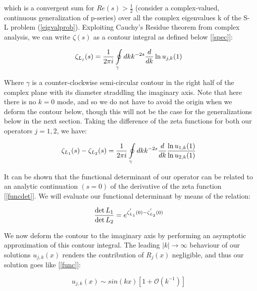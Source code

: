 \documentclass[12]{article}
\begin{document}
which is a convergent sum for \(Re(s) > \frac{1}{2}\) (consider a complex-valued, continuous generalization of p-series) over all the complex eigenvalues k of the S-L problem (\ref{eigvalprob}). Exploiting Cauchy's Residue theorem from complex analysis, we can write \(\zeta(s)\) as a contour integral as defined below [\ref{spec}]:

\begin{equation} \label{zeta}
    \zeta_{L_j}(s) = \frac{1}{2\pi i} \oint\limits_{\gamma}dk k^{-2s} \frac{d}{dk} \ln{u_{j,k}(1)} \\
\end{equation} 

Where \(\gamma\) is a counter-clockwise semi-circular contour in the right half of the complex plane with its diameter straddling the imaginary axis. Note that here there is no \(k = 0\) mode, and so we do not have to avoid the origin when we deform the contour below, though this will not be the case for the generalizations below in the next section. Taking the difference of the zeta functions for both our operators \(j = 1,2\), we have:

\begin{equation} \label{zeta2}
    \zeta_{L_1}(s) -  \zeta_{L_2}(s) = \frac{1}{2\pi i} \oint\limits_{\gamma}dk k^{-2s} \frac{d}{dk} \frac{\ln{u_{1,k}(1)}}{\ln{u_{2,k}(1)}} \\
\end{equation} 

It can be shown that the functional determinant of our operator can be related to an analytic continuation \((s=0)\) of the derivative of the zeta function [\ref{funcdet}]. We will evaluate our functional determinant by means of the relation: 

\begin{equation} \label{det}
    \frac{\det{L_1}}{\det{L_2}} = e^{\zeta^{'}_{L_1}(0) - \zeta^{'}_{L_2}(0)} \\
\end{equation} 

We now deform the contour to the imaginary axis by performing an asymptotic approximation of this contour integral. The leading \(|k| \longrightarrow  \infty\) behaviour of our solutions \(u_{j,k}(x)\) renders the contribution of \(R_j(x)\) negligible, and thus our solution goes like [\ref{func}]: 

\begin{equation} \label{eigvalprob}
    u_{j,k}(x) \sim sin(kx)[1 + \mathcal{O}(k^{-1})]
\end{equation} 
\end{document}
